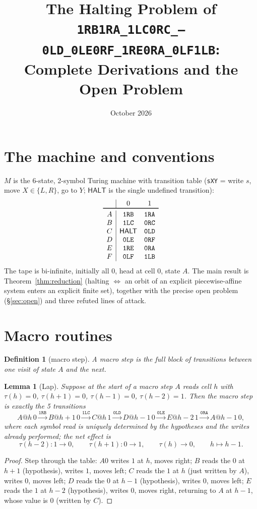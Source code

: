 \documentclass[11pt]{amsart}
\title{The Halting Problem of \texttt{1RB1RA\_1LC0RC\_---0LD\_0LE0RF\_1RE0RA\_0LF1LB}:\\ Complete Derivations and the Open Problem}
\author{}
\date{October 2026}
\newtheorem{lemma}[theorem]{Lemma}
\newtheorem{definition}[theorem]{Definition}
\newcommand{\HALT}{\textsf{HALT}}
\begin{document}
\maketitle

\section{The machine and conventions}

$M$ is the 6-state, 2-symbol Turing machine with transition table (\texttt{sXY} = write $s$, move $X\in\{L,R\}$, go to $Y$; $\HALT$ is the single undefined transition):
\[
\begin{array}{c|cc} & 0 & 1\\\toprule
A & \texttt{1RB} & \texttt{1RA}\\
B & \texttt{1LC} & \texttt{0RC}\\
C & \HALT & \texttt{0LD}\\
D & \texttt{0LE} & \texttt{0RF}\\
E & \texttt{1RE} & \texttt{0RA}\\
F & \texttt{0LF} & \texttt{1LB}
\end{array}
\]
The tape is bi-infinite, initially all $0$, head at cell $0$, state $A$. The main result is Theorem~\ref{thm:reduction} (halting $\iff$ an orbit of an explicit piecewise-affine system enters an explicit finite set), together with the precise open problem (\S\ref{sec:open}) and three refuted lines of attack.

\section{Macro routines}

\begin{definition}[macro step]
A macro step is the full block of transitions between one visit of state $A$ and the next.
\end{definition}

\begin{lemma}[Lap]\label{lem:lap}
Suppose at the start of a macro step $A$ reads cell $h$ with $\tau(h)=0$, $\tau(h{+}1)=0$, $\tau(h{-}1)=0$, $\tau(h{-}2)=1$. Then the macro step is exactly the 5 transitions
\[
A@h\,0 \xrightarrow{\texttt{1RB}} B@h{+}1\,0 \xrightarrow{\texttt{1LC}} C@h\,1 \xrightarrow{\texttt{0LD}} D@h{-}1\,0 \xrightarrow{\texttt{0LE}} E@h{-}2\,1 \xrightarrow{\texttt{0RA}} A@h{-}1\,0,
\]
where each symbol read is uniquely determined by the hypotheses and the writes already performed; the net effect is
\[
\tau(h{-}2)\colon 1\to 0,\qquad \tau(h{+}1)\colon 0\to 1,\qquad \tau(h)\to 0,\qquad h\mapsto h-1 .
\]
\end{lemma}
\begin{proof}
Step through the table: $A0$ writes $1$ at $h$, moves right; $B$ reads the $0$ at $h{+}1$ (hypothesis), writes $1$, moves left; $C$ reads the $1$ at $h$ (just written by $A$), writes $0$, moves left; $D$ reads the $0$ at $h{-}1$ (hypothesis), writes $0$, moves left; $E$ reads the $1$ at $h{-}2$ (hypothesis), writes $0$, moves right, returning to $A$ at $h{-}1$, whose value is $0$ (written by $C$).
\end{proof}
\end{document}
